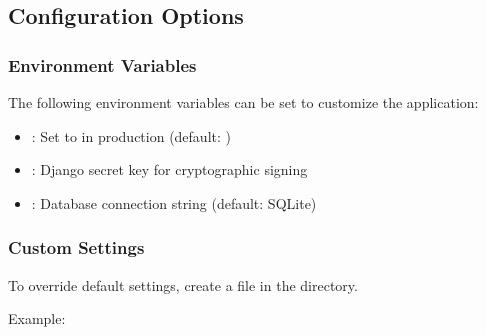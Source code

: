 \documentclass[letterpaper,10pt,english]{sphinxmanual}
\begin{document}
\subsection{Configuration Options}
\label{\detokenize{installation:configuration-options}}

\subsubsection{Environment Variables}
\label{\detokenize{installation:environment-variables}}
\sphinxAtStartPar
The following environment variables can be set to customize the application:
\begin{itemize}
\item {} 
\sphinxAtStartPar
{}: Set to  in production (default: )

\item {} 
\sphinxAtStartPar
{}: Django secret key for cryptographic signing

\item {} 
\sphinxAtStartPar
{}: Database connection string (default: SQLite)

\end{itemize}


\subsubsection{Custom Settings}
\label{\detokenize{installation:custom-settings}}
\sphinxAtStartPar
To override default settings, create a  file in the  directory.

\sphinxAtStartPar
Example:
\end{document}
